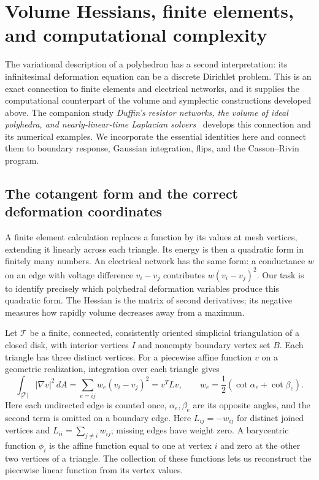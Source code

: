 \section{Volume Hessians, finite elements, and computational complexity}
\label{sec:ipolybridge}

The variational description of a polyhedron has a second interpretation:
its infinitesimal deformation equation can be a discrete Dirichlet
problem. This is an exact connection to finite elements and electrical
networks, and it supplies the computational counterpart of the volume
and symplectic constructions developed above. The companion study
\emph{Duffin's resistor networks, the volume of ideal polyhedra, and
nearly-linear-time Laplacian solvers}~\cite{IpolyStudy} develops this
connection and its numerical examples. We incorporate the essential
identities here and connect them to boundary response, Gaussian
integration, flips, and the Casson--Rivin program.

\subsection{The cotangent form and the correct deformation coordinates}
\label{subsec:ipolyCoordinates}

A finite element calculation replaces a function by its values at mesh
vertices, extending it linearly across each triangle. Its energy is
then a quadratic form in finitely many numbers. An electrical network
has the same form: a conductance $w$ on an edge with voltage difference
$v_i-v_j$ contributes $w(v_i-v_j)^2$. Our task is to identify precisely
which polyhedral deformation variables produce this quadratic form.
The Hessian is the matrix of second derivatives; its negative measures
how rapidly volume decreases away from a maximum.

Let $\mathcal T$ be a finite, connected, consistently oriented simplicial
triangulation of a closed disk, with interior vertices $I$ and nonempty
boundary vertex set $B$. Each triangle has three distinct vertices.
For a piecewise affine function $v$ on a
geometric realization, integration over each triangle gives
\begin{equation}
 \int_{|\mathcal T|}|\nabla v|^2\,dA
 =\sum_{e=ij}w_e(v_i-v_j)^2=v^TLv,
 \qquad
 w_e=\frac12(\cot\alpha_e+\cot\beta_e).
 \label{eq:ipolyFEM}
\end{equation}
Here each undirected edge is counted once, $\alpha_e,\beta_e$ are its
opposite angles, and the second term is omitted on a boundary edge.
Here $L_{ij}=-w_{ij}$ for distinct joined vertices and
$L_{ii}=\sum_{j\ne i}w_{ij}$; missing edges have weight zero.
A barycentric function $\phi_i$ is the affine function equal to one
at vertex $i$ and zero at the other two vertices of a triangle.
The collection of these functions lets us reconstruct the piecewise
linear function from its vertex values.

